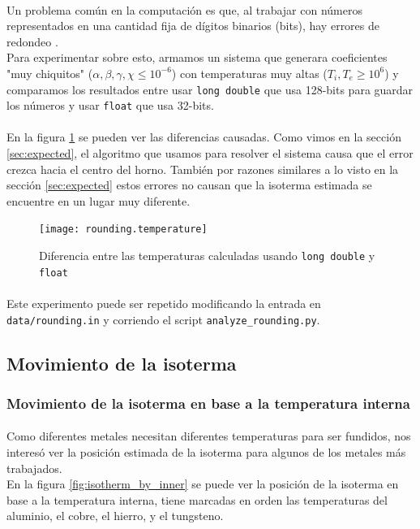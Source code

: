 \documentclass[12pt]{article}
\begin{document}
\paragraph{} Un problema común en la computación es que, al trabajar con números representados en una cantidad fija de dígitos binarios (bits), hay errores de redondeo \cite{rounding}. \\ %
Para experimentar sobre esto, armamos un sistema que generara coeficientes "muy chiquitos" (\(\alpha, \beta, \gamma, \chi \leq 10^{-6}\)) con temperaturas muy altas (\(T_i, T_e \geq 10^6\)) y comparamos los resultados entre usar \texttt{long double} que usa 128-bits para guardar los números y usar \texttt{float} que usa 32-bits.
\paragraph{} En la figura \ref{fig:rounding.diffs} se pueden ver las diferencias causadas. Como vimos en la sección \ref{sec:expected}, el algoritmo que usamos para resolver el sistema causa que el error crezca hacia el centro del horno. También por razones similares a lo visto en la sección \ref{sec:expected} estos errores no causan que la isoterma estimada se encuentre en un lugar muy diferente.

\begin{figure}[H]
\centering
\texttt{[image: rounding.temperature]}
\caption{Diferencia entre las temperaturas calculadas usando \texttt{long double} y \texttt{float}}
\label{fig:rounding.diffs}
\end{figure}

\paragraph{} Este experimento puede ser repetido modificando la entrada en \texttt{data/rounding.in} y corriendo el script \texttt{analyze\_rounding.py}.

\subsection{Movimiento de la isoterma}

\subsubsection{Movimiento de la isoterma en base a la temperatura interna}

\paragraph{} Como diferentes metales necesitan diferentes temperaturas para ser fundidos, nos interesó ver la posición estimada de la isoterma para algunos de los metales más trabajados. \\ %
En la figura \ref{fig:isotherm_by_inner} se puede ver la posición de la isoterma en base a la temperatura interna, tiene marcadas en orden las temperaturas del aluminio, el cobre, el hierro, y el tungsteno.
\end{document}
